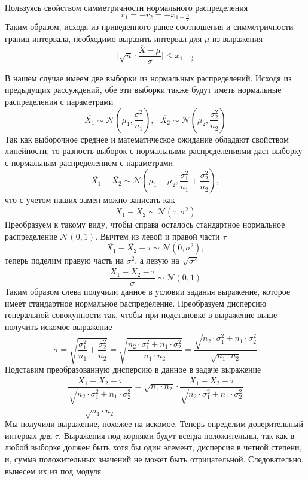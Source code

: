 \documentclass[a4paper, 12pt]{article}
\begin{document}
    \noindent Пользуясь свойством симметричности нормального распределения
    $$r_1=-r_2=-x_{1-\frac{\alpha}{2}}$$
    Таким образом, исходя из приведенного ранее соотношения и симметричности границ интервала, необходимо выразить интервал для $\mu$ из выражения 
    $$\Bigg|\sqrt{n}\cdot\dfrac{\overline{X}-\mu}{\sigma}\Bigg|\leq x_{1-\frac{\alpha}{2}}$$


    В нашем случае имеем две выборки из нормальных распределений. Исходя из предыдущих рассуждений, обе эти выборки
    также будут иметь нормальные распределения с параметрами
    $$\overline{X_1}\sim\mathcal{N}\left(\mu_1,\dfrac{\sigma_1^2}{n_1}\right),\,\,\,\,\overline{X_2}\sim\mathcal{N}\left(\mu_2,\dfrac{\sigma_2^2}{n_2}\right)$$
    Так как выборочное среднее и математическое ожидание обладают свойством линейности, то разность выборок с нормальными распределениями
    даст выборку с нормальным распределением с параметрами
    $$\overline{X_1}-\overline{X_2}\sim\mathcal{N}\left(\mu_1-\mu_2,\dfrac{\sigma_1^2}{n_1}+\dfrac{\sigma_2^2}{n_2}\right),$$
    что с учетом наших замен можно записать как $$\overline{X_1}-\overline{X_2}\sim\mathcal{N}\left(\tau,\sigma^2\right)$$
    Преобразуем к такому виду, чтобы справа осталось стандартное нормальное распределение $\mathcal{N}\left(0,1\right).$
    Вычтем из левой и правой части $\tau$
    $$\overline{X_1}-\overline{X_2}-\tau\sim\mathcal{N}\left(0,\sigma^2\right),$$
    теперь поделим правую часть на $\sigma^2$, а левую на $\sqrt{\sigma^2}$
    $$\dfrac{\overline{X_1}-\overline{X_2}-\tau}{\sigma}\sim\mathcal{N}\left(0,1\right)$$
    Таким образом слева получили данное в условии задания выражение, которое имеет стандартное нормальное распределение.
    Преобразуем дисперсию генеральной совокупности так, чтобы при подстановке в выражение выше получить искомое выражение
    $$\sigma=\sqrt{\dfrac{\sigma_1^2}{n_1}+\dfrac{\sigma_2^2}{n_2}}=\sqrt{\dfrac{n_2\cdot\sigma_1^2+n_1\cdot\sigma_2^2}{n_1\cdot n_2}}=\dfrac{\sqrt{n_2\cdot\sigma_1^2+n_1\cdot\sigma_2^2}}{\sqrt{n_1\cdot n_2}}$$
    Подставим преобразованную дисперсию в данное в задаче выражение
    $$\dfrac{\overline{X_1}-\overline{X_2}-\tau}{\dfrac{\sqrt{n_2\cdot\sigma_1^2+n_1\cdot\sigma_2^2}}{\sqrt{n_1\cdot n_2}}}=\sqrt{n_1\cdot n_2}\cdot\dfrac{\overline{X_1}-\overline{X_2}-\tau}{\sqrt{n_2\cdot\sigma_1^2+n_1\cdot\sigma_2^2}}$$
    Мы получили выражение, похожее на искомое. Теперь определим доверительный интервал для $\tau$. Выражения под корнями будут всегда положительны, так как в любой выборке должен быть хотя бы один элемент,
    дисперсия в четной степени, и, сумма положительных значений не может быть отрицательной. Следовательно, вынесем их из под модуля
\end{document}
